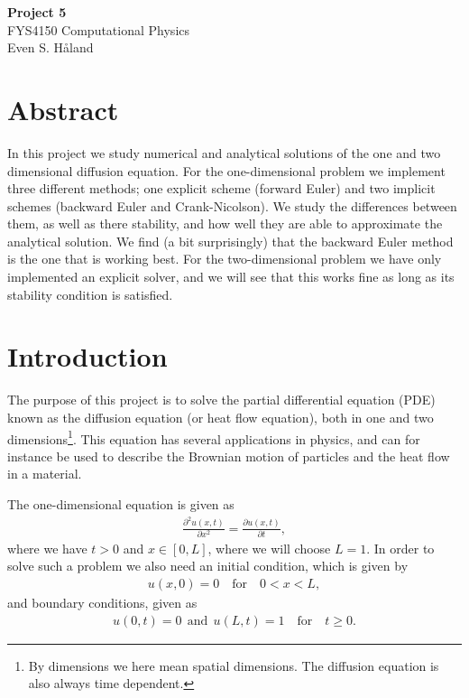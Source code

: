 \documentclass[12pt, a4paper]{article}
\begin{document}
\begin{titlepage}
\begin{center}
\vspace*{3cm}
\Huge
\textbf{Project 5} \\
\Large  
FYS4150 Computational Physics 
\vspace*{3cm} \\ 

Even S. Håland 
\vspace*{5cm} \\

\normalsize
\section*{Abstract}

In this project we study numerical and analytical solutions of the one and two dimensional diffusion 
equation. For the one-dimensional problem we implement three different methods; one explicit scheme 
(forward Euler) and two implicit schemes (backward Euler and Crank-Nicolson). We study the differences 
between them, as well as there stability, and how well they are able to approximate the analytical 
solution. We find (a bit surprisingly) that the backward Euler method is the one that is working best. 
For the two-dimensional problem we have only implemented an explicit solver, and we will see that this 
works fine as long as its stability condition is satisfied. 

\end{center}
\end{titlepage}

\section{Introduction}

The purpose of this project is to solve the partial differential equation (PDE) known as the 
diffusion equation (or heat flow equation), both in one and two dimensions\footnote{By  
dimensions we here mean spatial dimensions. The diffusion equation is also always time dependent.}. 
This equation has several applications in physics, and can for instance be used to describe the 
Brownian motion of particles and the heat flow in a material.   

The one-dimensional equation is given as 
\begin{align}
\frac{\partial ^2 u(x,t)}{\partial x^2} = \frac{\partial u(x,t)}{\partial t}, 
\label{eq:1d}
\end{align} 
where we have $t>0$ and $x\in [0,L]$, where we will choose $L=1$. In order to solve such a problem we 
also need an initial condition, which is given by 
\begin{align*}
u(x,0) = 0 \quad \text{for}  \quad 0<x<L, 
\end{align*} 
and boundary conditions, given as 
\begin{align*}
u(0,t) = 0 \:\: \text{and} \:\: u(L,t)=1 \quad \text{for} \quad t\geq 0.  
\end{align*}
\end{document}
